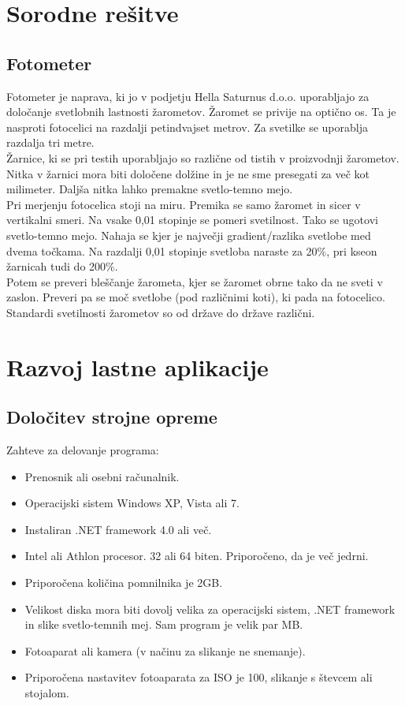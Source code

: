 \documentclass[oneside, a4paper, 12pt]{book}
\begin{document}
\chapter{Sorodne rešitve}
\section{Fotometer}
Fotometer je naprava, ki jo v podjetju Hella Saturnus d.o.o. uporabljajo za določanje svetlobnih lastnosti žarometov. Žaromet se privije na optično os. Ta je nasproti fotocelici na razdalji petindvajset metrov. Za svetilke se uporablja razdalja tri metre. \\
Žarnice, ki se pri testih uporabljajo so različne od tistih v proizvodnji žarometov. Nitka v žarnici mora biti določene dolžine in je ne sme presegati za več kot milimeter. Daljša nitka lahko premakne svetlo-temno mejo.\\
Pri merjenju fotocelica stoji na miru. Premika se samo žaromet in sicer v vertikalni smeri. Na vsake 0,01 stopinje se pomeri svetilnost. Tako se ugotovi svetlo-temno mejo. Nahaja se kjer je največji gradient/razlika svetlobe med dvema točkama. Na razdalji 0,01 stopinje svetloba naraste za 20\%, pri kseon žarnicah tudi do 200\%.\\
Potem se preveri bleščanje žarometa, kjer se žaromet obrne tako da ne sveti v zaslon. Preveri pa se moč svetlobe (pod različnimi koti), ki pada na fotocelico.   \\
Standardi svetilnosti žarometov so od države do države različni. 

\chapter{Razvoj lastne aplikacije}
\section{Določitev strojne opreme}
Zahteve za delovanje programa:
\begin{itemize}
\item Prenosnik ali osebni računalnik.
\item Operacijski sistem Windows XP, Vista ali 7.
\item Instaliran .NET framework 4.0 ali več.
\item Intel ali Athlon procesor. 32 ali 64 biten. Priporočeno, da je več jedrni.
\item Priporočena količina pomnilnika je 2GB.
\item Velikost diska mora biti dovolj velika za operacijski sistem, .NET framework in slike svetlo-temnih mej. Sam program je velik par MB. 
\item Fotoaparat ali kamera (v načinu za slikanje ne snemanje).
\item Priporočena nastavitev fotoaparata za ISO je 100, slikanje s števcem ali stojalom.
\end{itemize}
\end{document}
